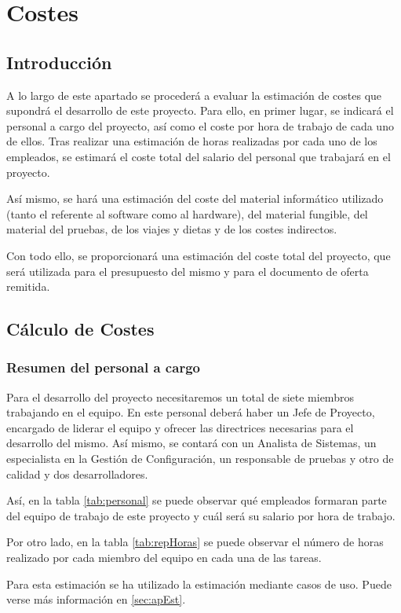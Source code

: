 
\chapter{Costes}\label{chap:costes}
\clearpage

\section{Introducción}
\par A lo largo de este apartado se procederá a evaluar la estimación de costes que supondrá el desarrollo de este proyecto. Para ello, en primer lugar, se indicará el personal a cargo del proyecto, así como el coste por hora de trabajo de cada uno de ellos. Tras realizar una estimación de horas realizadas por cada uno de los empleados, se estimará el coste total del salario del personal que trabajará en el proyecto.
\par Así mismo, se hará una estimación del coste del material informático utilizado (tanto el referente al software como al hardware), del material fungible, del material del pruebas, de los viajes y dietas y de los costes indirectos.
\par Con todo ello, se proporcionará una estimación del coste total del proyecto, que será utilizada para el presupuesto del mismo y para el documento de oferta remitida.

\section{Cálculo de Costes}

\subsection{Resumen del personal a cargo}
\par Para el desarrollo del proyecto necesitaremos un total de siete miembros trabajando en el equipo. En este personal deberá haber un Jefe de Proyecto, encargado de liderar el equipo y ofrecer las directrices necesarias para el desarrollo del mismo. Así mismo, se contará con un Analista de Sistemas, un especialista en la Gestión de Configuración, un responsable de pruebas y otro de calidad y dos desarrolladores.
\par Así, en la tabla \ref{tab:personal} se puede observar qué empleados formaran parte del equipo de trabajo de este proyecto y cuál será su salario por hora de trabajo.
\par Por otro lado, en la tabla \ref{tab:repHoras} se puede observar el número de horas realizado por cada miembro del equipo en cada una de las tareas.
\par Para esta estimación se ha utilizado la estimación mediante casos de uso. Puede verse más información en \ref{sec:apEst}.

